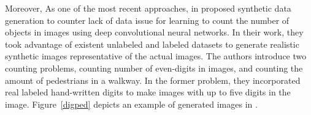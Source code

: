  

 
Moreover, As one of the most recent approaches, \citeauthor*{segui2015learning} in \cite{segui2015learning} proposed synthetic data generation to counter lack of data issue for learning to count the number of objects in images using deep convolutional neural networks. In their work, they took advantage of existent unlabeled and labeled datasets to generate realistic synthetic images representative of the actual images. The authors introduce two counting problems, counting number of even-digits in images, and counting the amount of pedestrians in a walkway. In the former problem, they incorporated real labeled hand-written digits to make images with up to five digits in the image. Figure~\ref{digped} depicts an example of generated images in \cite{segui2015learning}.


